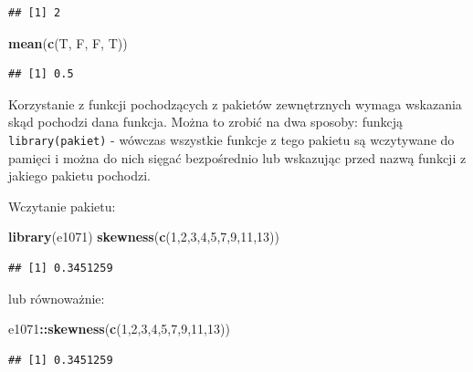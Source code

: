 \documentclass[]{book}
\newenvironment{Shaded}{\begin{snugshade}}{\end{snugshade}}
\newcommand{\KeywordTok}[1]{\textcolor[rgb]{0.13,0.29,0.53}{\textbf{#1}}}
\newcommand{\DecValTok}[1]{\textcolor[rgb]{0.00,0.00,0.81}{#1}}
\newcommand{\OperatorTok}[1]{\textcolor[rgb]{0.81,0.36,0.00}{\textbf{#1}}}
\newcommand{\NormalTok}[1]{#1}
\begin{document}
\begin{verbatim}
## [1] 2
\end{verbatim}

\begin{Shaded}
\begin{Highlighting}[]
\KeywordTok{mean}\NormalTok{(}\KeywordTok{c}\NormalTok{(T, F, F, T))}
\end{Highlighting}
\end{Shaded}

\begin{verbatim}
## [1] 0.5
\end{verbatim}

Korzystanie z funkcji pochodzących z pakietów zewnętrznych wymaga
wskazania skąd pochodzi dana funkcja. Można to zrobić na dwa sposoby:
funkcją \texttt{library(pakiet)} - wówczas wszystkie funkcje z tego
pakietu są wczytywane do pamięci i można do nich sięgać bezpośrednio lub
wskazując przed nazwą funkcji z jakiego pakietu pochodzi.

Wczytanie pakietu:

\begin{Shaded}
\begin{Highlighting}[]
\KeywordTok{library}\NormalTok{(e1071)}
\KeywordTok{skewness}\NormalTok{(}\KeywordTok{c}\NormalTok{(}\DecValTok{1}\NormalTok{,}\DecValTok{2}\NormalTok{,}\DecValTok{3}\NormalTok{,}\DecValTok{4}\NormalTok{,}\DecValTok{5}\NormalTok{,}\DecValTok{7}\NormalTok{,}\DecValTok{9}\NormalTok{,}\DecValTok{11}\NormalTok{,}\DecValTok{13}\NormalTok{))}
\end{Highlighting}
\end{Shaded}

\begin{verbatim}
## [1] 0.3451259
\end{verbatim}

lub równoważnie:

\begin{Shaded}
\begin{Highlighting}[]
\NormalTok{e1071}\OperatorTok{::}\KeywordTok{skewness}\NormalTok{(}\KeywordTok{c}\NormalTok{(}\DecValTok{1}\NormalTok{,}\DecValTok{2}\NormalTok{,}\DecValTok{3}\NormalTok{,}\DecValTok{4}\NormalTok{,}\DecValTok{5}\NormalTok{,}\DecValTok{7}\NormalTok{,}\DecValTok{9}\NormalTok{,}\DecValTok{11}\NormalTok{,}\DecValTok{13}\NormalTok{))}
\end{Highlighting}
\end{Shaded}

\begin{verbatim}
## [1] 0.3451259
\end{verbatim}
\end{document}
